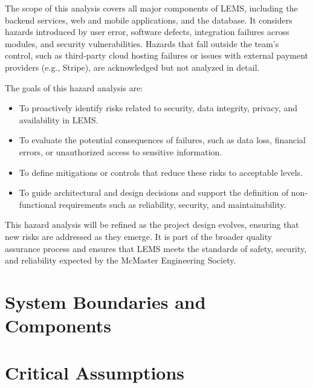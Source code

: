 \documentclass{article}
\begin{document}
The scope of this analysis covers all major components of LEMS, including the backend services, 
web and mobile applications, and the database. It considers hazards introduced by user error, software 
defects, integration failures across modules, and security vulnerabilities. Hazards that fall outside the 
team’s control, such as third-party cloud hosting failures or issues with external payment providers 
(e.g., Stripe), are acknowledged but not analyzed in detail.

\par
\vspace{1em}

The goals of this hazard analysis are:
\begin{itemize}
  \item To proactively identify risks related to security, data integrity, privacy, and availability in LEMS.
  \item To evaluate the potential consequences of failures, such as data loss, financial errors, or 
        unauthorized access to sensitive information.
  \item To define mitigations or controls that reduce these risks to acceptable levels.
  \item To guide architectural and design decisions and support the definition of non-functional 
        requirements such as reliability, security, and maintainability.
\end{itemize}

This hazard analysis will be refined as the project design evolves, ensuring that new risks are 
addressed as they emerge. It is part of the broader quality assurance process and ensures that LEMS 
meets the standards of safety, security, and reliability expected by the McMaster Engineering Society.

\section{System Boundaries and Components}


\section{Critical Assumptions}
\end{document}
